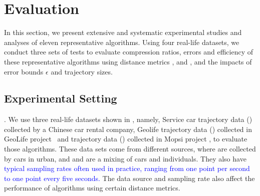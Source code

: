 \section{Evaluation} %
\label{sec-exp}
In this section, we present extensive and systematic experimental studies and analyses of eleven representative \lsa algorithms.
Using four real-life datasets, we conduct three sets of tests to evaluate compression ratios, errors and efficiency of these representative algorithms using distance metrics \ped, \sed and \dad, and the impacts of error bounds $\epsilon$ and trajectory sizes.
%

\subsection{Experimental Setting}

.
We use three real-life datasets shown in , namely, Service car trajectory data (\ucar) collected by a Chinese car rental company, Geolife trajectory data (\geolife) collected in GeoLife project~\cite{Web:Geolife} and \mopsi trajectory data (\mopsi) collected in Mopsi project \cite{Web:Mopsi}, to evaluate those \lsa algorithms.
These data sets come from different sources, where \ucar are collected by cars in urban, and \geolife and \mopsi are a mixing of cars and individuals. They also have \textcolor{blue} {typical sampling rates often used in practice, ranging from one point per second to one point every five seconds.}
The data source and sampling rate also affect the performance of \lsa algorithms using certain distance metrics.

